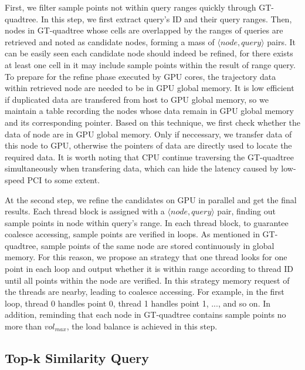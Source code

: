 \documentclass[conference]{IEEEtran}
\begin{document}
First, we filter sample points not within query ranges quickly through GT-quadtree. In this step, we first extract query's ID and their query ranges. Then, nodes in GT-quadtree whose cells are overlapped by the ranges of queries are retrieved and noted as candidate nodes, forming a mass of $\langle node, query\rangle $ pairs. It can be easily seen each candidate node should indeed be refined, for there exists at least one cell in it may include sample points within the result of range query. To prepare for the refine phase executed by GPU cores, the trajectory data within retrieved node are needed to be in GPU global memory. It is low efficient if duplicated data are transfered from host to GPU global memory, so we maintain a table recording the nodes whose data remain in GPU global memory and its corresponding pointer. Based on this technique, we first check whether the data of node are in GPU global memory. Only if neccessary, we transfer data of this node to GPU, otherwise the pointers of data are directly used to locate the required data. It is worth noting that CPU continue traversing the GT-quadtree simultaneously when transfering data, which can hide the latency caused by low-speed PCI to some extent. 

At the second step, we refine the candidates on GPU in parallel and get the final results. Each thread block is assigned with a $\langle node, query\rangle $ pair, finding out sample points in node within query's range. In each thread block, to guarantee coalesce accessing, sample points are verified in loops. As mentioned in GT-quadtree, sample points of the same node are stored continuously in global memory. For this reason, we propose an strategy that one thread looks for one point in each loop and output whether it is within range according to thread ID until all points within the node are verified. In this strategy memory request of the threads are nearby, leading to coalesce accessing. For example, in the first loop, thread 0 handles point 0, thread 1 handles point 1, ..., and so on. In addition, reminding that each node in GT-quadtree contains sample points no more than $vol_{max}$, the load balance is achieved in this step.


\subsection{Top-k Similarity Query}
\end{document}

